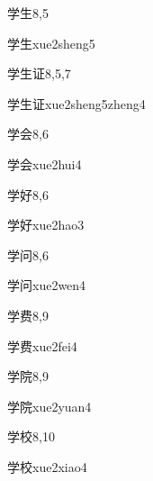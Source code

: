 \begin{entry}{学生}{8,5}
  \begin{phonetics}{学生}{xue2sheng5}
  \end{phonetics}
\end{entry}

\begin{entry}{学生证}{8,5,7}
  \begin{phonetics}{学生证}{xue2sheng5zheng4}
  \end{phonetics}
\end{entry}

\begin{entry}{学会}{8,6}
  \begin{phonetics}{学会}{xue2hui4}
  \end{phonetics}
\end{entry}

\begin{entry}{学好}{8,6}
  \begin{phonetics}{学好}{xue2hao3}
  \end{phonetics}
\end{entry}

\begin{entry}{学问}{8,6}
  \begin{phonetics}{学问}{xue2wen4}
  \end{phonetics}
\end{entry}

\begin{entry}{学费}{8,9}
  \begin{phonetics}{学费}{xue2fei4}
  \end{phonetics}
\end{entry}

\begin{entry}{学院}{8,9}
  \begin{phonetics}{学院}{xue2yuan4}
  \end{phonetics}
\end{entry}

\begin{entry}{学校}{8,10}
  \begin{phonetics}{学校}{xue2xiao4}
  \end{phonetics}
\end{entry}

